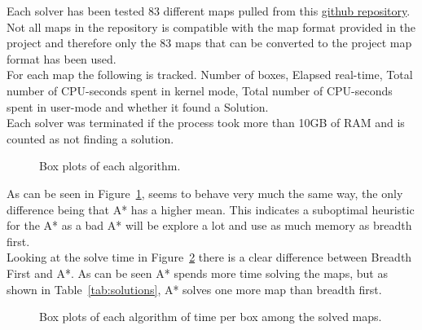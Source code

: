 \documentclass[../../main.tex]{subfiles}
\begin{document}
Each solver has been tested 83 different maps pulled from this
\href{https://github.com/bravegnu/python-sokoban}{github repository}.
Not all maps in the repository is compatible with the map format provided in the project
and therefore only the 83 maps that can be converted to the project map format has been used.\\

For each map the following is tracked. Number of boxes, Elapsed real-time,
Total number of CPU-seconds spent in kernel mode, Total number of CPU-seconds spent in user-mode and whether it found a Solution.\\

Each solver was terminated if the process took more than 10GB of RAM and is counted as not finding a solution.


\begin{figure}[h]
	\centering
	\caption{Box plots of each algorithm.}%
	\label{fig:boxplots}
\end{figure}

As can be seen in Figure~\ref{fig:boxplots}, seems to behave very much the same way, the only
difference being that A* has a higher mean. This indicates a suboptimal heuristic for the A*
as a bad A* will be explore a lot and use as much memory as breadth first.\\

Looking at the solve time in Figure~\ref{fig:boxplots_time} there is a clear difference between
Breadth First and A*. As can be seen A* spends more time solving the maps, but as shown in
Table~\ref{tab:solutions}, A* solves one more map than breadth first.\\

\begin{figure}[h]
	\centering

	\caption{Box plots of each algorithm of time per box among the solved maps.}%
	\label{fig:boxplots_time}
\end{figure}
\end{document}

